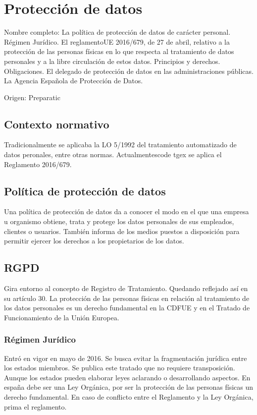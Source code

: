 \setcounter{section}{26}
\section{Protección de datos}

Nombre completo: La política de protección de datos de carácter personal. Régimen Jurídico. El reglamentoUE 2016/679, de 27 de abril, relativo a la protección de las personas físicas en lo que respecta al tratamiento de datos personales y a la libre circulación de estos datos. Principios y derechos. Obligaciones. El delegado de protección de datos en las administraciones públicas. La Agencia Española de Protección de Datos.

Origen: Preparatic

\localtableofcontents

\subsection{Contexto normativo}
Tradicionalmente se aplicaba la LO 5/1992 del tratamiento automatizado de datos peronales, entre otras normas. Actualmentescode tgex se aplica el Reglamento 2016/679.


\subsection{Política de protección de datos}
Una política de protección de datos da a conocer el modo en el que una empresa u organismo obtiene, trata y protege los datos personales de sus empleados, clientes o usuarios. También informa de los medios puestos a disposición para permitir ejercer los derechos a los propietarios de los datos.

\subsection{RGPD}
    Gira entorno al concepto de Registro de Tratamiento. Quedando reflejado así en su artículo 30. La protección de las personas físicas en relación al tratamiento de los datos personales es un derecho fundamental en la CDFUE y en el Tratado de Funcionamiento de la Unión Europea. 

    \subsubsection{Régimen Jurídico}
        Entró en vigor en mayo de 2016. Se busca evitar la fragmentación jurídica entre los estados miembros. Se publica este tratado que no requiere transposición. Aunque los estados pueden elaborar leyes aclarando o desarrollando aspectos. En españa debe ser una Ley Orgánica, por ser la protección de las personas físicas un derecho fundamental. En caso de conflicto entre el Reglamento y la Ley Orgánica, prima el reglamento.

